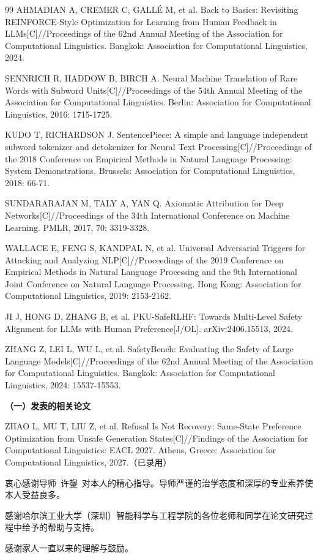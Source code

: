 \documentclass[fontset=fandol,type=master,campus=shenzhen,etitleauto=true]{hithesisbook}
\begin{document}
\begin{thebibliography}{99}
 AHMADIAN A, CREMER C, GALL\'E M, et al. Back to Basics: Revisiting REINFORCE-Style Optimization for Learning from Human Feedback in LLMs[C]//Proceedings of the 62nd Annual Meeting of the Association for Computational Linguistics. Bangkok: Association for Computational Linguistics, 2024.

 SENNRICH R, HADDOW B, BIRCH A. Neural Machine Translation of Rare Words with Subword Units[C]//Proceedings of the 54th Annual Meeting of the Association for Computational Linguistics. Berlin: Association for Computational Linguistics, 2016: 1715-1725.

 KUDO T, RICHARDSON J. SentencePiece: A simple and language independent subword tokenizer and detokenizer for Neural Text Processing[C]//Proceedings of the 2018 Conference on Empirical Methods in Natural Language Processing: System Demonstrations. Brussels: Association for Computational Linguistics, 2018: 66-71.

 SUNDARARAJAN M, TALY A, YAN Q. Axiomatic Attribution for Deep Networks[C]//Proceedings of the 34th International Conference on Machine Learning. PMLR, 2017, 70: 3319-3328.

 WALLACE E, FENG S, KANDPAL N, et al. Universal Adversarial Triggers for Attacking and Analyzing NLP[C]//Proceedings of the 2019 Conference on Empirical Methods in Natural Language Processing and the 9th International Joint Conference on Natural Language Processing. Hong Kong: Association for Computational Linguistics, 2019: 2153-2162.

 JI J, HONG D, ZHANG B, et al. PKU-SafeRLHF: Towards Multi-Level Safety Alignment for LLMs with Human Preference[J/OL]. arXiv:2406.15513, 2024.

 ZHANG Z, LEI L, WU L, et al. SafetyBench: Evaluating the Safety of Large Language Models[C]//Proceedings of the 62nd Annual Meeting of the Association for Computational Linguistics. Bangkok: Association for Computational Linguistics, 2024: 15537-15553.

\end{thebibliography}

\begin{publication}
\noindent\textbf{（一）发表的相关论文}

\noindent [1] ZHAO L, MU T, LIU Z, et al. Refusal Is Not Recovery: Same-State Preference Optimization from Unsafe Generation States[C]//Findings of the Association for Computational Linguistics: EACL 2027. Athens, Greece: Association for Computational Linguistics, 2027.（已录用）
\end{publication}

\authorization

\begin{acknowledgements}
衷心感谢导师~许鋆~对本人的精心指导。导师严谨的治学态度和深厚的专业素养使本人受益良多。

感谢哈尔滨工业大学（深圳）智能科学与工程学院的各位老师和同学在论文研究过程中给予的帮助与支持。

感谢家人一直以来的理解与鼓励。
\end{acknowledgements}
\end{document}
